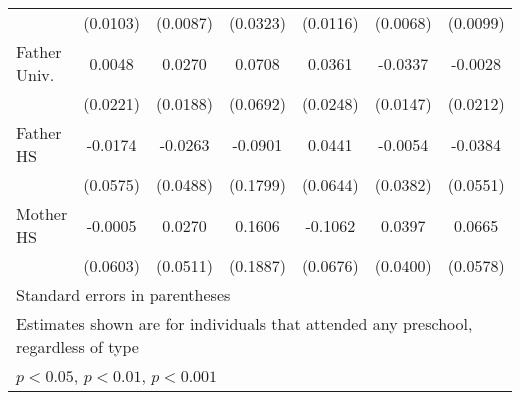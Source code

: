 \begin{table}[htbp]
\begin{tabular}{l*{6}{c}}
            &    (0.0103)         &    (0.0087)         &    (0.0323)         &    (0.0116)         &    (0.0068)         &    (0.0099)         \\
\addlinespace
Father Univ.&      0.0048         &      0.0270         &      0.0708         &      0.0361         &     -0.0337\sym{*}  &     -0.0028         \\
            &    (0.0221)         &    (0.0188)         &    (0.0692)         &    (0.0248)         &    (0.0147)         &    (0.0212)         \\
\addlinespace
Father HS   &     -0.0174         &     -0.0263         &     -0.0901         &      0.0441         &     -0.0054         &     -0.0384         \\
            &    (0.0575)         &    (0.0488)         &    (0.1799)         &    (0.0644)         &    (0.0382)         &    (0.0551)         \\
\addlinespace
Mother HS   &     -0.0005         &      0.0270         &      0.1606         &     -0.1062         &      0.0397         &      0.0665         \\
            &    (0.0603)         &    (0.0511)         &    (0.1887)         &    (0.0676)         &    (0.0400)         &    (0.0578)         \\
\bottomrule
\multicolumn{7}{l}{\footnotesize Standard errors in parentheses}\\
\multicolumn{7}{l}{\footnotesize Estimates shown are for individuals that attended any preschool, regardless of type}\\
\multicolumn{7}{l}{\footnotesize \sym{*} \(p<0.05\), \sym{**} \(p<0.01\), \sym{***} \(p<0.001\)}\\
\end{tabular}
\end{table}
